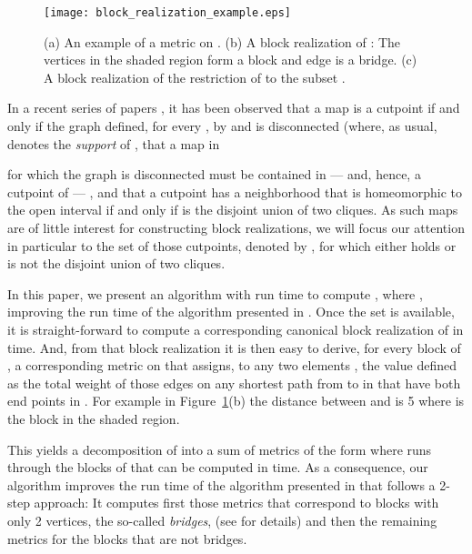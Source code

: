 \documentclass[12pt]{article}
\begin{document}
\begin{figure}
\centering
\texttt{[image: block\_realization\_example.eps]}
\caption{(a) An example of a metric  on .
         (b) A block realization of : The vertices in the shaded
             region form a block and edge  is a bridge.
         (c) A block realization of the restriction  of  to
             the subset .}
\label{figure:block:realization}
\end{figure}

In a recent series of papers 
\cite{dre-hub-koo-08a,dress:huber:compatible:decompositions:2008,dress:huber:koolen:moulton:cut:points:2007},
it has been observed 
that a map  is a  cutpoint if and only
if the graph
 defined, for every , by 
 and   is disconnected (where, as usual, 
 denotes the \emph{support} of , that a map  in 

for which the graph  is disconnected 
must be contained in --- and, hence, a cutpoint of --- ,
and that a cutpoint  has a neighborhood that is homeomorphic to the open interval 
 if and only if   is the disjoint union of two cliques. 
As such maps are of little interest for constructing block realizations, 
we will focus our attention in particular to the set of those cutpoints, denoted by , 
for which either  holds or
 is not the disjoint union of two cliques.


In this paper, we present an algorithm with run time  to compute ,
where , improving the run time of the algorithm presented
in \cite{dress:virtual:cutpoints:2007}. Once the set  is available, 
it is straight-forward to compute a corresponding canonical 
block realization  of  in  time.
And, from that block realization it is then easy
to derive, for every block  of , a 
corresponding metric  on  that assigns, to any two elements
, the value  defined as the
total weight of those edges on any shortest path
from  to  in  that have both
end points in . For example in Figure~\ref{figure:block:realization}(b) 
the distance  between
 and  is 5 where  is the block in the
shaded region.

This yields a decomposition of  into 
a sum of metrics 
of the form 
 where  runs through the
blocks of  that can
be computed in  time. As a consequence, our algorithm improves 
the run time of the algorithm presented in 
\cite{hertz:varone:cutpoint:partition} 
that follows a 2-step approach: It computes
first those metrics 
 that correspond to blocks  with only 2 vertices, the so-called
\emph{bridges}, (see \cite{hertz:varone:bridge:partition} for
details) and then the remaining metrics  for the blocks  that
are not bridges.
\end{document}

